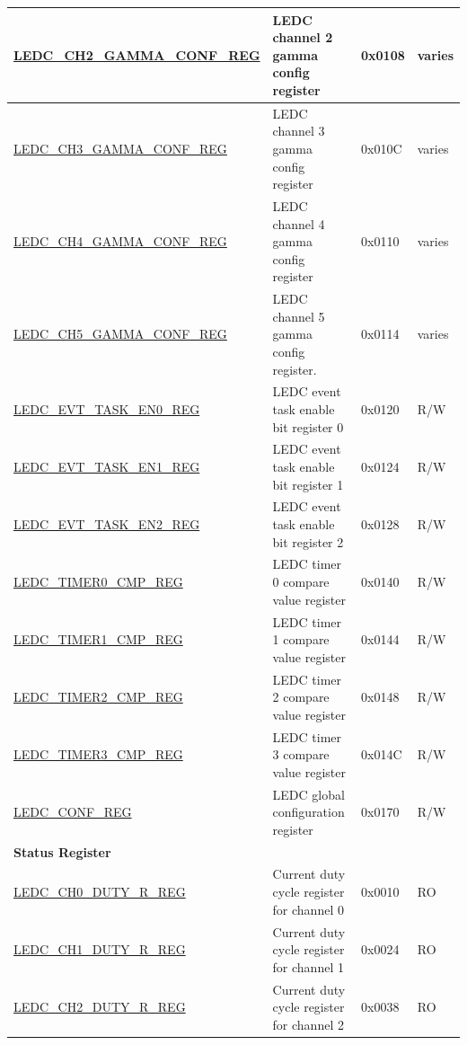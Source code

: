 \begin{longtable}{ | p{5.5cm} | p{6.8cm} | p{1.3cm} | p{2cm}| }
    \hyperref[regdesc:LEDCCHNGAMMACONFREG]{LEDC\_CH2\_GAMMA\_CONF\_REG} & LEDC channel 2 gamma config register & 0x0108 & varies \\ \hline
    \hyperref[regdesc:LEDCCHNGAMMACONFREG]{LEDC\_CH3\_GAMMA\_CONF\_REG} & LEDC channel 3 gamma config register & 0x010C & varies \\ \hline
    \hyperref[regdesc:LEDCCHNGAMMACONFREG]{LEDC\_CH4\_GAMMA\_CONF\_REG} & LEDC channel 4 gamma config register & 0x0110 & varies \\ \hline
    \hyperref[regdesc:LEDCCHNGAMMACONFREG]{LEDC\_CH5\_GAMMA\_CONF\_REG} & LEDC channel 5 gamma config register. & 0x0114 & varies \\ \hline
    \hyperref[regdesc:LEDCEVTTASKEN0REG]{LEDC\_EVT\_TASK\_EN0\_REG} & LEDC event task enable bit register 0 & 0x0120 & R/W \\ \hline
    \hyperref[regdesc:LEDCEVTTASKEN1REG]{LEDC\_EVT\_TASK\_EN1\_REG} & LEDC event task enable bit register 1 & 0x0124 & R/W \\ \hline
    \hyperref[regdesc:LEDCEVTTASKEN2REG]{LEDC\_EVT\_TASK\_EN2\_REG} & LEDC event task enable bit register 2 & 0x0128 & R/W \\ \hline
    \hyperref[regdesc:LEDCTIMERNCMPREG]{LEDC\_TIMER0\_CMP\_REG} & LEDC timer 0 compare value register & 0x0140 & R/W \\ \hline
    \hyperref[regdesc:LEDCTIMERNCMPREG]{LEDC\_TIMER1\_CMP\_REG} & LEDC timer 1 compare value register & 0x0144 & R/W \\ \hline
    \hyperref[regdesc:LEDCTIMERNCMPREG]{LEDC\_TIMER2\_CMP\_REG} & LEDC timer 2 compare value register & 0x0148 & R/W \\ \hline
    \hyperref[regdesc:LEDCTIMERNCMPREG]{LEDC\_TIMER3\_CMP\_REG} & LEDC timer 3 compare value register & 0x014C & R/W \\ \hline
    \hyperref[regdesc:LEDCCONFREG]{LEDC\_CONF\_REG} & LEDC global configuration register & 0x0170 & R/W \\ \hline
    \multicolumn{4}{|l|}{\textbf{Status Register}} \\ \hline
    \hyperref[regdesc:LEDCCHNDUTYRREG]{LEDC\_CH0\_DUTY\_R\_REG} & Current duty cycle register for channel 0 & 0x0010 & RO \\ \hline
    \hyperref[regdesc:LEDCCHNDUTYRREG]{LEDC\_CH1\_DUTY\_R\_REG} & Current duty cycle register for channel 1 & 0x0024 & RO \\ \hline
    \hyperref[regdesc:LEDCCHNDUTYRREG]{LEDC\_CH2\_DUTY\_R\_REG} & Current duty cycle register for channel 2 & 0x0038 & RO \\ \hline

\end{longtable}
